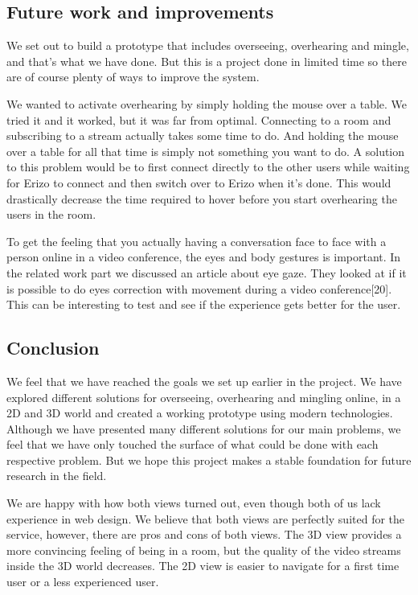 \documentclass[12pt, titlepage]{article}
\begin{document}
\subsection{Future work and improvements}
We set out to build a prototype that includes overseeing, overhearing and mingle, and that’s what we have done. But this is a project done in limited time so there are of course plenty of ways to improve the system.

We wanted to activate overhearing by simply holding the mouse over a table. We tried it and it worked, but it was far from optimal. Connecting to a room and subscribing to a stream actually takes some time to do. And holding the mouse over a table for all that time is simply not something you want to do. A solution to this problem would be to first connect directly to the other users while waiting for Erizo to connect and then switch over to Erizo when it’s done. This would drastically decrease the time required to hover before you start overhearing the users in the room.

To get the feeling that you actually having a conversation face to face with a person online in a video conference, the eyes and body gestures is important. In the related work part we discussed an article about eye gaze. They looked at if it is possible to do eyes correction with movement during a video conference[20]. This can be interesting to test and see if the experience gets better for the user.
\subsection{Conclusion}
We feel that we have reached the goals we set up earlier in the project. We have explored different solutions for overseeing, overhearing and mingling online, in a 2D and 3D world and created a working prototype using modern technologies. Although we have presented many different solutions for our main problems, we feel that we have only touched the surface of what could be done with each respective problem. But we hope this project makes a stable foundation for future research in the field.

We are happy with how both views turned out, even though both of us lack experience in web design. We believe that both views are perfectly suited for the service, however, there are pros and cons of both views. The 3D view provides a more convincing feeling of being in a room, but the quality of the video streams inside the 3D world decreases. The 2D view is easier to navigate for a first time user or a less experienced user. 
\end{document}
